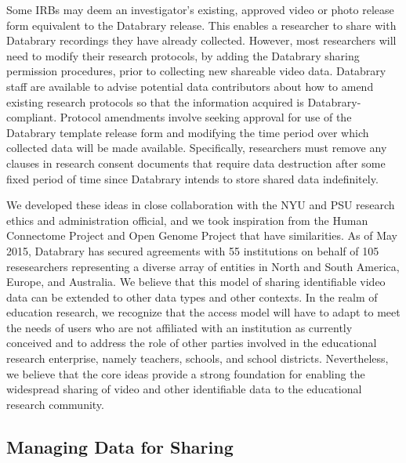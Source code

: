 \documentclass[letterpaper,man,apacite]{apa6}
\begin{document}
Some IRBs may deem an investigator’s existing, approved video or photo release form equivalent to the Databrary release. 
This enables a researcher to share with Databrary recordings they have already collected. 
However, most researchers will need to modify their research protocols, by adding the Databrary sharing permission procedures, prior to collecting new shareable video data. 
Databrary staff are available to advise potential data contributors about how to amend existing research
protocols so that the information acquired is Databrary-compliant.
Protocol amendments involve seeking approval for use of the Databrary template release form and modifying the time period over which collected data will be made available. 
Specifically, researchers must remove any clauses in research consent documents that require data destruction after some fixed period of time since Databrary intends to store shared data indefinitely.

We developed these ideas in close collaboration with the NYU and PSU research ethics and administration official, and we took inspiration from the Human Connectome Project and Open Genome Project that have similarities.
As of May 2015, Databrary has secured agreements with 55 institutions on behalf of 105 resesearchers representing a diverse array of entities in North and South America, Europe, and Australia.
We believe that this model of sharing identifiable video data can be extended to other data types and other contexts.
In the realm of education research, we recognize that the access model will have to adapt to meet the needs of users who are not affiliated with an institution as currently conceived and to address the role of other parties involved in the educational research enterprise, namely teachers, schools, and school districts.
Nevertheless, we believe that the core ideas provide a strong foundation for enabling the widespread sharing of video and other identifiable data to the educational research community.

\subsection{Managing Data for Sharing}
\end{document}
